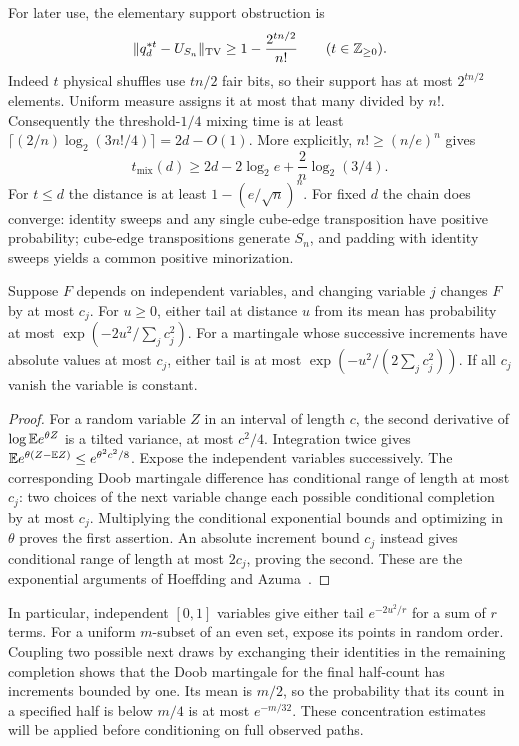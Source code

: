 For later use, the elementary support obstruction is
\begin{equation}\label{eq:support}
 \|q_d^{*t}-U_{S_n}\|_{\mathrm{TV}}\ge1-\frac{2^{tn/2}}{n!}
 \qquad(t\in\mathbb Z_{\ge0}).
\end{equation}
Indeed $t$ physical shuffles use $tn/2$ fair bits, so their support
has at most $2^{tn/2}$ elements. Uniform measure assigns it at most
that many divided by $n!$. Consequently the threshold-$1/4$ mixing
time is at least
$\lceil(2/n)\log_2(3n!/4)\rceil=2d-O(1)$. More explicitly,
$n!\ge(n/e)^n$ gives
\begin{equation}\label{mart:lower-exact}
 t_{\mathrm{mix}}(d)\ge
 2d-2\log_2 e+\frac2n\log_2(3/4).
\end{equation}
For $t\le d$ the distance is at least $1-(e/\sqrt n)^n$.
For fixed $d$ the chain
does converge: identity sweeps and any single cube-edge transposition
have positive probability; cube-edge transpositions generate $S_n$,
and padding with identity sweeps yields a common positive minorization.

\begin{lemma}[Concentration]\label{lem:concentration}
Suppose $F$ depends on independent variables, and changing variable $j$
changes $F$ by at most $c_j$. For $u\ge0$, either tail at distance $u$
from its mean has probability at most
$\exp(-2u^2/\sum_jc_j^2)$. For a martingale whose successive increments
have absolute values at most $c_j$, either tail is at most
$\exp(-u^2/(2\sum_jc_j^2))$. If all $c_j$ vanish the variable is constant.
\end{lemma}
\begin{proof}
For a random variable $Z$ in an interval of length $c$, the second
 derivative of $\log\mathbb E e^{\theta Z}$ is a tilted variance, at most
$c^2/4$. Integration twice gives
$\mathbb E e^{\theta(Z-\mathbb E Z)}\le e^{\theta^2c^2/8}$.
Expose the independent variables successively. The corresponding Doob
martingale difference has conditional range of length at most $c_j$:
two choices of the next variable change each possible conditional
completion by at most $c_j$. Multiplying the conditional exponential
bounds and optimizing in $\theta$ proves the first assertion. An
absolute increment bound $c_j$ instead gives conditional range of
length at most $2c_j$, proving the second. These are the exponential
arguments of Hoeffding and Azuma~\cite{hoeffding1963,azuma1967}.
\end{proof}

In particular, independent $[0,1]$ variables give either tail
$e^{-2u^2/r}$ for a sum of $r$ terms. For a uniform $m$-subset of
an even set, expose its points in random order. Coupling two possible
next draws by exchanging their identities in the remaining completion
shows that the Doob martingale for the final half-count has increments
bounded by one. Its mean is $m/2$, so the probability that its count
in a specified half is below $m/4$ is at most $e^{-m/32}$. These
concentration estimates will be applied before conditioning on full
observed paths.
